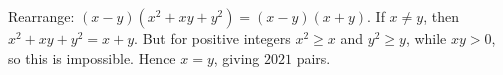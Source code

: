 Rearrange: $(x-y)(x^2+xy+y^2)=(x-y)(x+y)$. If $x\ne y$, then $x^2+xy+y^2=x+y$. But for positive integers $x^2\ge x$ and $y^2\ge y$, while $xy>0$, so this is impossible. Hence $x=y$, giving $\boxed{2021}$ pairs.
